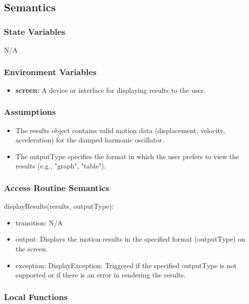 \documentclass[12pt, titlepage]{article}
\begin{document}
\subsection{Semantics}

\subsubsection{State Variables}
N/A

\subsubsection{Environment Variables}
\begin{itemize}
  \item \textbf{screen:} A device or interface for displaying results to the user.
\end{itemize}

\subsubsection{Assumptions}

\begin{itemize}
  \item The results object contains valid motion data (displacement, velocity, acceleration) for the damped harmonic oscillator.
  \item The outputType specifies the format in which the user prefers to view the results (e.g., "graph", "table").
\end{itemize}

\subsubsection{Access Routine Semantics}

\noindent displayResults(results, outputType):
\begin{itemize}
\item transition: N/A
\item output: Displays the motion results in the specified format (outputType) on the screen.
\item exception: DisplayException: Triggered if the specified outputType is not supported or if there is an error in rendering the results.
\end{itemize}

\subsubsection{Local Functions}
\end{document}
